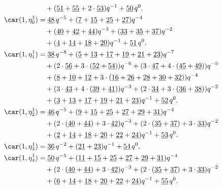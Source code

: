 \begin{align*}
	&\quad+(\underline{51}+\underline{55}+2\cdot\underline{53})q^{-1}+\underline{50}\,q^0.\\
	\car(1,\eta^{1}_{0})
	&=\underline{48}\,q^{-5}+(\underline{7}+\underline{15}+\underline{25}+\underline{27})q^{-4}\\
	&\quad+(\underline{40}+\underline{42}+\underline{44})q^{-3}+(\underline{33}+\underline{35}+\underline{37})q^{-2}\\
	&\quad+(\underline{4}+\underline{14}+\underline{18}+\underline{20})q^{-1}+\underline{51}\,q^0.\\
	\car(1,\eta^{1}_{1})
	&=\underline{38}\,q^{-8}+(\underline{5}+\underline{13}+\underline{17}+\underline{19}+\underline{21}+\underline{23})q^{-7}\\
	&\quad+(2\cdot\underline{56}+3\cdot(\underline{52}+\underline{54}))q^{-6}+(3\cdot\underline{47}+4\cdot(\underline{45}+\underline{49}))q^{-5}\\
	&\quad+(\underline{8}+\underline{10}+\underline{12}+3\cdot(\underline{16}+\underline{26}+\underline{28}+\underline{30}+\underline{32}))q^{-4}\\
	&\quad+(3\cdot\underline{43}+4\cdot(\underline{39}+\underline{41}))q^{-3}+(2\cdot\underline{34}+3\cdot(\underline{36}+\underline{38}))q^{-2}\\
	&\quad+(\underline{3}+\underline{13}+\underline{17}+\underline{19}+\underline{21}+\underline{23})q^{-1}+\underline{52}\,q^0.\\
	\car(1,\eta^{1}_{2})
	&=\underline{46}\,q^{-5}+(\underline{9}+\underline{15}+\underline{25}+\underline{27}+\underline{29}+\underline{31})q^{-4}\\
	&\quad+(2\cdot(\underline{40}+\underline{44})+3\cdot\underline{42})q^{-3}+(2\cdot(\underline{35}+\underline{37})+3\cdot\underline{33})q^{-2}\\
	&\quad+(\underline{2}+\underline{14}+\underline{18}+\underline{20}+\underline{22}+\underline{24})q^{-1}+\underline{53}\,q^0.\\
	\car(1,\eta^{1}_{3})
	&=\underline{36}\,q^{-2}+(\underline{21}+\underline{23})q^{-1}+\underline{54}\,q^0.\\
	\car(1,\eta^{1}_{4})
	&=\underline{50}\,q^{-5}+(\underline{11}+\underline{15}+\underline{25}+\underline{27}+\underline{29}+\underline{31})q^{-4}\\
	&\quad+(2\cdot(\underline{40}+\underline{44})+3\cdot\underline{42})q^{-3}+(2\cdot(\underline{35}+\underline{37})+3\cdot\underline{33})q^{-2}\\
	&\quad+(\underline{6}+\underline{14}+\underline{18}+\underline{20}+\underline{22}+\underline{24})q^{-1}+\underline{55}\,q^0.\\

\end{align*}
